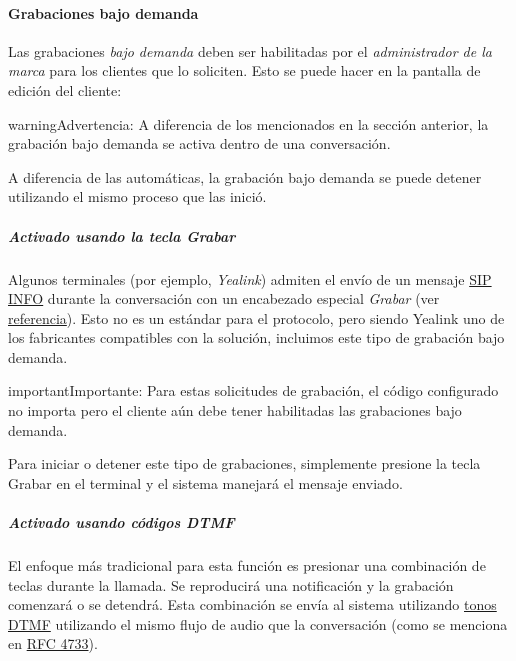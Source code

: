\documentclass[letterpaper,10pt,spanish]{sphinxmanual}
\begin{document}
\paragraph{Grabaciones bajo demanda}
\label{administration_portal/client/retail/calls/call_recordings:on-demand-recordings}
Las grabaciones \emph{bajo demanda} deben ser habilitadas por el \emph{administrador de la marca} para los clientes que lo soliciten. Esto se puede hacer en la pantalla de edición del cliente:

\begin{notice}{warning}{Advertencia:}
A diferencia de los {\hyperref[administration_portal/client/vpbx/services:services]{}} mencionados en la sección anterior, la grabación bajo demanda se activa dentro de una conversación.
\end{notice}

A diferencia de las automáticas, la grabación bajo demanda se puede detener utilizando el mismo proceso que las inició.


\subparagraph{Activado usando la tecla \emph{Grabar}}
\label{administration_portal/client/retail/calls/call_recordings:activated-using-the-record-key}
Algunos terminales (por ejemplo, \emph{Yealink}) admiten el envío de un mensaje \href{https://tools.ietf.org/html/rfc6086}{SIP INFO} durante la conversación con un encabezado especial \emph{Grabar} (ver \href{http://www.yealink.com/Upload/document/UsingCallRecordingFeatureonYealinkPhones/UsingCallRecordingFeatureonYealinkSIPT2XPphonesRev\_610-20561729764.pdf}{referencia}). Esto no es un estándar para el protocolo, pero siendo Yealink uno de los fabricantes compatibles con la solución, incluimos este tipo de grabación bajo demanda.

\begin{notice}{important}{Importante:}
Para estas solicitudes de grabación, el código configurado no importa pero el cliente aún debe tener habilitadas las grabaciones bajo demanda.
\end{notice}

Para iniciar o detener este tipo de grabaciones, simplemente presione la tecla Grabar en el terminal y el sistema manejará el mensaje enviado.


\subparagraph{Activado usando códigos \emph{DTMF}}
\label{administration_portal/client/retail/calls/call_recordings:activated-using-dtmf-codes}
El enfoque más tradicional para esta función es presionar una combinación de teclas durante la llamada. Se reproducirá una notificación y la grabación comenzará o se detendrá. Esta combinación se envía al sistema utilizando \href{https://es.wikipedia.org/wiki/Marcaci\%C3\%B3n\_por\_tonos}{tonos DTMF} utilizando el mismo flujo de audio que la conversación (como se menciona en \href{https://tools.ietf.org/html/rfc4733}{RFC 4733}).
\end{document}
